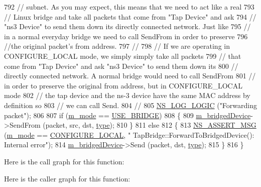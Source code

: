 \begin{DoxyCode}
792   \textcolor{comment}{// subnet.  As you may expect, this means that we need to act like a real}
793   \textcolor{comment}{// Linux bridge and take all packets that come from "Tap Device" and ask }
794   \textcolor{comment}{// "ns3 Device" to send them down its directly connected network.  Just like }
795   \textcolor{comment}{// in a normal everyday bridge we need to call SendFrom in order to preserve }
796   \textcolor{comment}{//the original packet's from address.}
797   \textcolor{comment}{//}
798   \textcolor{comment}{// If we are operating in CONFIGURE\_LOCAL mode, we simply simply take all packets}
799   \textcolor{comment}{// that come from "Tap Device" and ask "ns3 Device" to send them down its }
800   \textcolor{comment}{// directly connected network.  A normal bridge would need to call SendFrom}
801   \textcolor{comment}{// in order to preserve the original from address, but in CONFIGURE\_LOCAL mode}
802   \textcolor{comment}{// the tap device and the ns-3 device have the same MAC address by definition so }
803   \textcolor{comment}{// we can call Send.}
804   \textcolor{comment}{//}
805   \hyperlink{group__logging_ga88acd260151caf2db9c0fc84997f45ce}{NS\_LOG\_LOGIC} (\textcolor{stringliteral}{"Forwarding packet"});
806 
807   \textcolor{keywordflow}{if} (\hyperlink{classns3_1_1TapBridge_aaae30bc9d5dd36e3a4d569cf9bcf40eb}{m\_mode} == \hyperlink{classns3_1_1TapBridge_acac8d3ebe259ddfa9cd369515f04618da33daa0eda93d6ec20fc491d7c440fc8d}{USE\_BRIDGE})
808     \{
809       \hyperlink{classns3_1_1TapBridge_ac4ba97368116b628d632d318d5562420}{m\_bridgedDevice}->SendFrom (packet, src, dst, \hyperlink{visualizer-ideas_8txt_add98db9e15e2a58cf2b57623e7aa893a}{type});
810     \}
811   \textcolor{keywordflow}{else}
812     \{
813       \hyperlink{assert_8h_aff5ece9066c74e681e74999856f08539}{NS\_ASSERT\_MSG} (\hyperlink{classns3_1_1TapBridge_aaae30bc9d5dd36e3a4d569cf9bcf40eb}{m\_mode} == \hyperlink{classns3_1_1TapBridge_acac8d3ebe259ddfa9cd369515f04618daf2d0f6c8152d38e9400b2d9fd35f02a3}{CONFIGURE\_LOCAL}, \textcolor{stringliteral}{"
      TapBridge::ForwardToBridgedDevice(): Internal error"});
814       \hyperlink{classns3_1_1TapBridge_ac4ba97368116b628d632d318d5562420}{m\_bridgedDevice}->Send (packet, dst, \hyperlink{visualizer-ideas_8txt_add98db9e15e2a58cf2b57623e7aa893a}{type});
815     \}
816 \}
\end{DoxyCode}


Here is the call graph for this function\+:




Here is the caller graph for this function\+:


